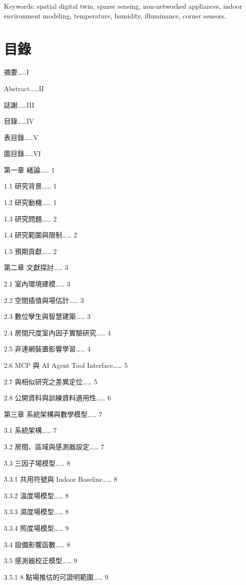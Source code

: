 \documentclass[12pt,a4paper]{article}
\begin{document}
Keywords: spatial digital twin, sparse sensing, non-networked appliances, indoor environment modeling, temperature, humidity, illuminance, corner sensors.


\clearpage

\section*{目錄}

摘要……I


Abstract……II


誌謝……III


目錄……IV


表目錄……V


圖目錄……VI


第一章 緒論…… 1


  1.1 研究背景…… 1


  1.2 研究動機…… 1


  1.3 研究問題…… 2


  1.4 研究範圍與限制…… 2


  1.5 預期貢獻…… 2


第二章 文獻探討…… 3


  2.1 室內環境建模…… 3


  2.2 空間插值與場估計…… 3


  2.3 數位孿生與智慧建築…… 3


  2.4 房間尺度室內因子實驗研究…… 4


  2.5 非連網裝置影響學習…… 4


  2.6 MCP 與 AI Agent Tool Interface…… 5


  2.7 與相似研究之差異定位…… 5


  2.8 公開資料與訓練資料適用性…… 6


第三章 系統架構與數學模型…… 7


  3.1 系統架構…… 7


  3.2 房間、區域與感測器設定…… 7


  3.3 三因子場模型…… 8


    3.3.1 共用符號與 Indoor Baseline…… 8


    3.3.2 溫度場模型…… 8


    3.3.3 濕度場模型…… 8


    3.3.4 照度場模型…… 9


  3.4 設備影響函數…… 8


  3.5 感測器校正模型…… 9


    3.5.1 8 點場推估的可證明範圍…… 9
\end{document}

